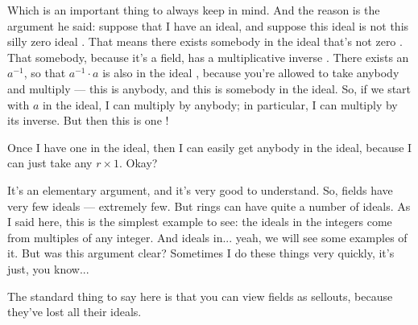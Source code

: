 \begin{speech}[00:40:37 - 00:42:20]
Which is an important thing to always keep in mind. And the reason is the argument he said: suppose that I have an ideal, and suppose this ideal is not this silly zero ideal . That means there exists somebody in the ideal that's not zero . That somebody, because it's a field, has a multiplicative inverse . There exists an $a^{-1}$, so that $a^{-1} \cdot a$ is also in the ideal , because you're allowed to take anybody and multiply --- this is anybody, and this is somebody in the ideal. So, if we start with $a$ in the ideal, I can multiply by anybody; in particular, I can multiply by its inverse. But then this is one !

Once I have one in the ideal, then I can easily get anybody in the ideal, because I can just take any $r \times 1$. Okay?

It's an elementary argument, and it's very good to understand. So, fields have very few ideals --- extremely few. But rings can have quite a number of ideals. As I said here, this is the simplest example to see: the ideals in the integers come from multiples of any integer. And ideals in... yeah, we will see some examples of it. But was this argument clear? Sometimes I do these things very quickly, it's just, you know...

The standard thing to say here is that you can view fields as sellouts, because they've lost all their ideals. 
\end{speech}

